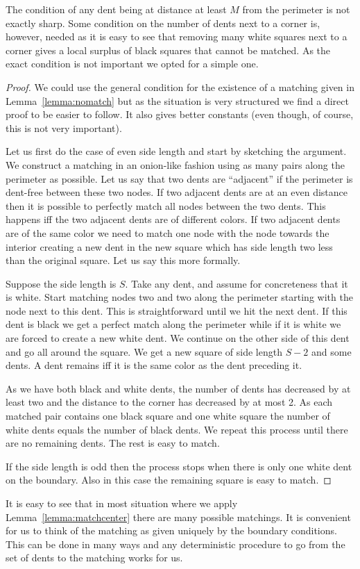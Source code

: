 \documentclass{theoretics}
\begin{document}
\begin{remark}
The condition of any dent being at distance at least
$M$ from the perimeter is not exactly sharp.
Some condition on the number of dents next to
a corner is, however, needed as it is easy to see that removing many white
squares next to a corner gives a local surplus of black
squares that cannot be matched.  As the exact condition
is not important we opted for a simple one.
\end{remark}

\begin{proof}
We could use the general condition for the existence 
of a matching given in Lemma~\ref{lemma:nomatch} but
as the situation is very structured we find a direct
proof to be easier to follow.  It also gives better
constants (even though, of course, this is not very important).

Let us first do the case of even side length and
start by sketching the argument.  We construct
a matching in an onion-like fashion using as many pairs
along the perimeter as possible.  Let us say that two dents
are ``adjacent'' if the perimeter is dent-free between these
two nodes.  If two adjacent dents are 
at an even distance then it is possible to perfectly
match all nodes between the two dents.  This happens
iff the two adjacent dents are of different colors.
If two adjacent dents are of the same color we need
to match one node with the node towards the interior
creating a new dent in the new square which has side
length two less than the original square.  Let us
say this more formally.

Suppose the side length is $S$.
Take any dent, and assume for concreteness that it is white.
Start matching nodes two and two
along the perimeter starting with the node next to this dent. 
This is straightforward until we hit the next dent.
If this dent is black we get a perfect match along the perimeter
while if it is white we are forced to create a new white dent.
We continue on the other side of this dent and go all around
the square.  We get a new square of side length $S-2$ and
some dents.  A dent remains iff it is the same color 
as the dent preceding it.

As we have both black and white dents, the number
of dents has decreased by at least two and the distance
to the corner has decreased by at most 2.  As each
matched pair contains one black square and one white
square the number of white dents equals the number
of black dents.
We repeat this process until there are no remaining dents.
The rest is easy to match.

If the side length is odd then the process stops
when there is only one white dent on the boundary.
Also in this case the remaining square is easy to
match.
\end{proof}
It is easy to see that in most situation where we
apply Lemma~\ref{lemma:matchcenter} there are many possible
matchings.  It is convenient for us
to think of the matching as given uniquely by the boundary conditions.
This can be done in many ways and any deterministic procedure
to go from the set of dents to the matching works
for us.
\end{document}
